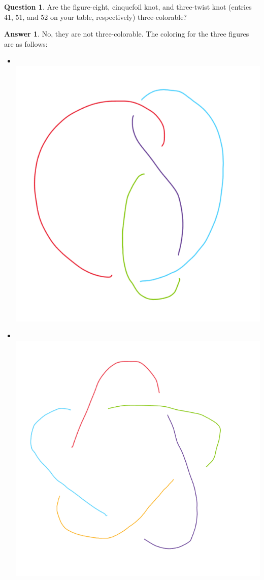 \documentclass[article, 12pt]{article}
\theoremstyle{definition}
\newtheorem{question}{Question}
\newtheorem{answer}{Answer}
\begin{document}
    \begin{question}
        Are the figure-eight, cinquefoil knot, and three-twist knot (entries 41, 51, and 52 on your table, respectively) three-colorable?
    \end{question}
    \begin{answer}
        No, they are not three-colorable. The coloring for the three figures are as follows:
        \begin{itemize}
            \item \ \\ \includegraphics[scale=.2]{figure_8.png}
            \item \ \\ \includegraphics[scale=.2]{star.png}

\end{itemize}
\end{answer}
\end{document}
